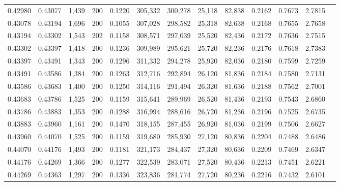 \begin{tabular}{rrrrrrrrrrrrr}
0.42980 & 0.43077 & 1,439 & 200 &                                     0.1220 & 305,332 & 300,278 &  25,118 &  82,838 & 0.2162 & 0.7673 & 2.7815 \\
0.43078 & 0.43194 & 1,696 & 200 &                                     0.1055 & 307,028 & 298,582 &  25,318 &  82,638 & 0.2168 & 0.7655 & 2.7658 \\
0.43194 & 0.43302 & 1,543 & 202 &                                     0.1158 & 308,571 & 297,039 &  25,520 &  82,436 & 0.2172 & 0.7636 & 2.7515 \\
0.43302 & 0.43397 & 1,418 & 200 &                                     0.1236 & 309,989 & 295,621 &  25,720 &  82,236 & 0.2176 & 0.7618 & 2.7383 \\
0.43397 & 0.43491 & 1,343 & 200 &                                     0.1296 & 311,332 & 294,278 &  25,920 &  82,036 & 0.2180 & 0.7599 & 2.7259 \\
0.43491 & 0.43586 & 1,384 & 200 &                                     0.1263 & 312,716 & 292,894 &  26,120 &  81,836 & 0.2184 & 0.7580 & 2.7131 \\
0.43586 & 0.43683 & 1,400 & 200 &                                     0.1250 & 314,116 & 291,494 &  26,320 &  81,636 & 0.2188 & 0.7562 & 2.7001 \\
0.43683 & 0.43786 & 1,525 & 200 &                                     0.1159 & 315,641 & 289,969 &  26,520 &  81,436 & 0.2193 & 0.7543 & 2.6860 \\
0.43786 & 0.43883 & 1,353 & 200 &                                     0.1288 & 316,994 & 288,616 &  26,720 &  81,236 & 0.2196 & 0.7525 & 2.6735 \\
0.43883 & 0.43960 & 1,161 & 200 &                                     0.1470 & 318,155 & 287,455 &  26,920 &  81,036 & 0.2199 & 0.7506 & 2.6627 \\
0.43960 & 0.44070 & 1,525 & 200 &                                     0.1159 & 319,680 & 285,930 &  27,120 &  80,836 & 0.2204 & 0.7488 & 2.6486 \\
0.44070 & 0.44176 & 1,493 & 200 &                                     0.1181 & 321,173 & 284,437 &  27,320 &  80,636 & 0.2209 & 0.7469 & 2.6347 \\
0.44176 & 0.44269 & 1,366 & 200 &                                     0.1277 & 322,539 & 283,071 &  27,520 &  80,436 & 0.2213 & 0.7451 & 2.6221 \\
0.44269 & 0.44363 & 1,297 & 200 &                                     0.1336 & 323,836 & 281,774 &  27,720 &  80,236 & 0.2216 & 0.7432 & 2.6101 \\

\end{tabular}
